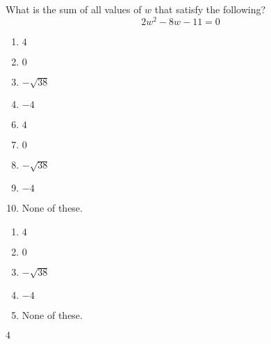  
What is the sum of all values of $w$ that satisfy the following? $$2w^2-8w-11=0$$


\ifsat
	\begin{enumerate}[label=\Alph*)]
		\item $4 $ %
		\item $0 $ 
		\item $-\sqrt{38} $ 
		\item $-4 $
	\end{enumerate}
\else
\fi

\ifacteven
	\begin{enumerate}[label=\textbf{\Alph*.},itemsep=\fill,align=left]
		\setcounter{enumii}{5}
		\item $4 $ %
		\item $0 $ 
		\item $-\sqrt{38} $ 
		\addtocounter{enumii}{1}
		\item $-4 $
		\item None of these. 
	\end{enumerate}
\else
\fi

\ifactodd
	\begin{enumerate}[label=\textbf{\Alph*.},itemsep=\fill,align=left]
		\item $4 $ %
		\item $0 $ 
		\item $-\sqrt{38} $ 
		\item $-4 $
		\item None of these. 
	\end{enumerate}
\else
\fi

\ifgridin
 $4 $ %
		
\else
\fi


